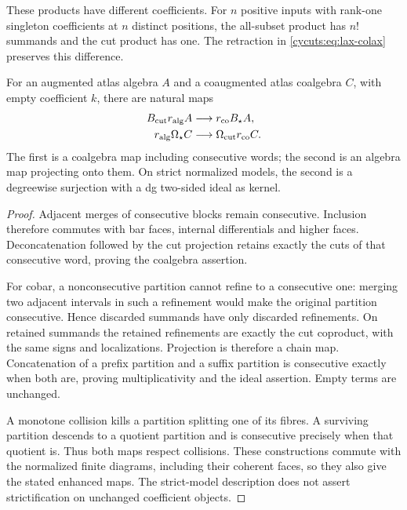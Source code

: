 These products have different coefficients. For $n$ positive inputs
with rank-one singleton coefficients at $n$ distinct positions, the
all-subset product has $n!$ summands and the cut product has one.
The retraction in \eqref{cycuts:eq:lax-colax} preserves this difference.

\begin{proposition}\label{cycuts:prop:bar-cobar-maps}
For an augmented atlas algebra $A$ and a coaugmented atlas coalgebra
$C$, with empty coefficient $k$, there are natural maps
\begin{align}
 B_{\mathrm{cut}} r_{\mathrm{alg}}A&\longrightarrow r_{\mathrm{co}}B_\star A,
                  \label{cycuts:eq:bar-map}\\
 r_{\mathrm{alg}}\Omega_\star C&\longrightarrow\Omega_{\mathrm{cut}} r_{\mathrm{co}}C.
                  \label{cycuts:eq:cobar-map}
\end{align}
The first is a coalgebra map including consecutive words; the second
is an algebra map projecting onto them. On strict normalized models,
the second is a degreewise surjection with a dg two-sided ideal as kernel.
\end{proposition}
\begin{proof}
Adjacent merges of consecutive blocks remain consecutive. Inclusion
therefore commutes with bar faces, internal differentials and higher
faces. Deconcatenation followed by the cut projection retains exactly
the cuts of that consecutive word, proving the coalgebra assertion.

For cobar, a nonconsecutive partition cannot refine to a consecutive
one: merging two adjacent intervals in such a refinement would make
the original partition consecutive. Hence discarded summands have
only discarded refinements. On retained summands the retained
refinements are exactly the cut coproduct, with the same signs and
localizations. Projection is therefore a chain map. Concatenation of
a prefix partition and a suffix partition is consecutive exactly
when both are, proving multiplicativity and the ideal assertion.
Empty terms are unchanged.

A monotone collision kills a partition splitting one of its fibres.
A surviving partition descends to a quotient partition and is
consecutive precisely when that quotient is. Thus both maps respect
collisions. These constructions commute with the normalized finite
diagrams, including their coherent faces, so they also give the
stated enhanced maps. The strict-model description does not assert
strictification on unchanged coefficient objects.
\end{proof}

